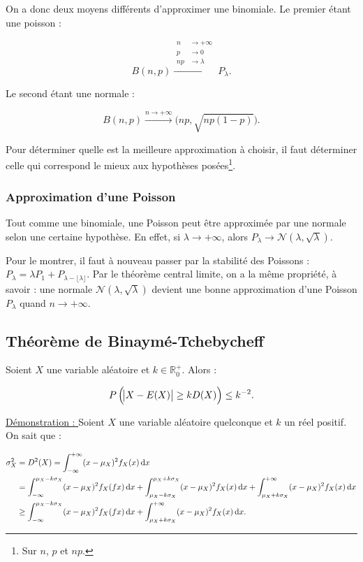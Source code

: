 \documentclass{article}
\begin{document}
			On a donc deux moyens différents d'approximer une binomiale. Le premier étant une poisson :

			\[B(n, p) \stackrel{\begin{aligned}n&\to+\infty\\p&\to0\\np&\to\lambda\end{aligned}}{\longrightarrow}P_\lambda.\]

			Le second étant une normale :

			\[B(n, p) \stackrel{n\to+\infty}{\longrightarrow}\mathcal(np, \sqrt {np(1-p)}).\]

			Pour déterminer quelle est la meilleure approximation à choisir, il faut déterminer celle qui correspond le mieux aux hypothèses posées\footnote{Sur $n$, $p$ et $np$.}.

		\subsubsection{Approximation d'une Poisson}
			Tout comme une binomiale, une Poisson peut être approximée par une normale selon une certaine hypothèse. En effet, si $\lambda \to +\infty$, alors
			$P_\lambda \to \mathcal N(\lambda, \sqrt \lambda)$.

			Pour le montrer, il faut à nouveau passer par la stabilité des Poissons : $P_\lambda = \lambda P_1 + P_{\lambda-\lfloor\lambda\rfloor}$. Par le théorème central limite,
			on a la même propriété, à savoir : une normale $\mathcal N(\lambda, \sqrt \lambda)$ devient une bonne approximation d'une Poisson $P_\lambda$ quand $n \to +\infty$.

	\subsection{Théorème de Binaymé-Tchebycheff}
		Soient $X$ une variable aléatoire et $k \in \mathbb R_0^+$. Alors :

		\[P\left(\abs{X-E(X)} \geq kD(X)\right) \leq k^{-2}.\]

		\underline{Démonstration : } Soient $X$ une variable aléatoire quelconque et $k$ un réel positif. On sait que :

		\begin{align*}
			\sigma_X^2 &= D^2(X) = \int_{-\infty}^{+\infty}(x-\mu_X)^2f_X(x)\dif x \\
			           &= \int_{-\infty}^{\mu_X-k\sigma_X} (x-\mu_X)^2f_X(fx)\dif x + \int_{\mu_X - k\sigma_X}^{\mu_X + k\sigma_X}(x-\mu_X)^2f_X(x)\dif x + \int_{\mu_X + k\sigma_X}^{+\infty}(x-\mu_X)^2f_X(x)\dif x \\
					   &\geq \int_{-\infty}^{\mu_X-k\sigma_X}(x-\mu_X)^2f_X(fx)\dif x + \int_{\mu_X + k\sigma_X}^{+\infty}(x-\mu_X)^2f_X(x)\dif x.
		\end{align*}
\end{document}
